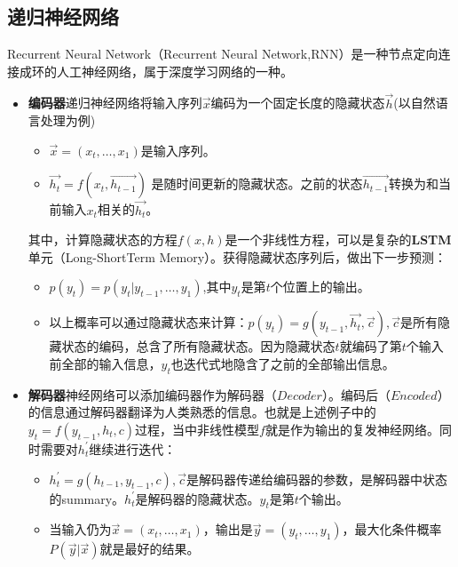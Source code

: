 \subsection{递归神经网络}{Recurrent Neural Network}\cite{ wiki:RNN}（Recurrent Neural Network,RNN）是一种节点定向连接成环的人工神经网络，属于深度学习网络的一种。
\begin{itemize}
  \item \textbf{编码器}递归神经网络将输入序列$\vec{x}$编码为一个固定长度的隐藏状态$\vec{h}$(以自然语言处理为例)
  \begin{itemize}
    \item $\vec{x}=\left(x_{t}, \ldots, x_{1}\right)$是输入序列。
    \item $\overrightarrow{h_{t}}=f\left(x_{t}, \overrightarrow{h_{t-1}}\right)$ 是随时间更新的隐藏状态。之前的状态$\overrightarrow{h_{t-1}}$转换为和当前输入$x_t$相关的$\overrightarrow{h_{t}}$。
  \end{itemize}
  其中，计算隐藏状态的方程$f(x,h)$是一个非线性方程，可以是复杂的\textbf{LSTM}单元（Long-ShortTerm Memory）。获得隐藏状态序列后，做出下一步预测：
  \begin{itemize}
    \item $p\left(y_{t}\right)=p\left(y_{t} | y_{t-1}, \ldots, y_{1}\right)$,其中$y_{t}$是第$t$个位置上的输出。
    \item 以上概率可以通过隐藏状态来计算：$p\left(y_{t}\right)=g\left(y_{t-1}, \overrightarrow{h_{t}}, \vec{c}\right), \vec{c}$是所有隐藏状态的编码，总含了所有隐藏状态。因为隐藏状态$t$就编码了第$t$个输入前全部的输入信息，$y_{t}$也迭代式地隐含了之前的全部输出信息。
  \end{itemize}
  \item \textbf{解码器}神经网络可以添加编码器作为解码器（$Decoder$）。编码后（$Encoded$）的信息通过解码器翻译为人类熟悉的信息。也就是上述例子中的$y_{t}=f\left(y_{t-1}, h_{t}, c\right)$过程，当中非线性模型$f$就是作为输出的复发神经网络。同时需要对$h_t^{'}$继续进行迭代：
  \begin{itemize}
    \item $h_{t}^{\prime}=g\left(h_{t-1}, y_{t-1}, c\right), \vec{c}$是解码器传递给编码器的参数，是解码器中状态的summary。$h_t^{'}$是解码器的隐藏状态。$y_t$是第$t$个输出。
    \item 当输入仍为$\vec{x}=\left(x_{t}, \ldots, x_{1}\right)$，输出是$\vec{y}=\left(y_{t}, \ldots, y_{1}\right)$，最大化条件概率$P(\vec{y} | \vec{x})$就是最好的结果。
  \end{itemize}
\end{itemize}


